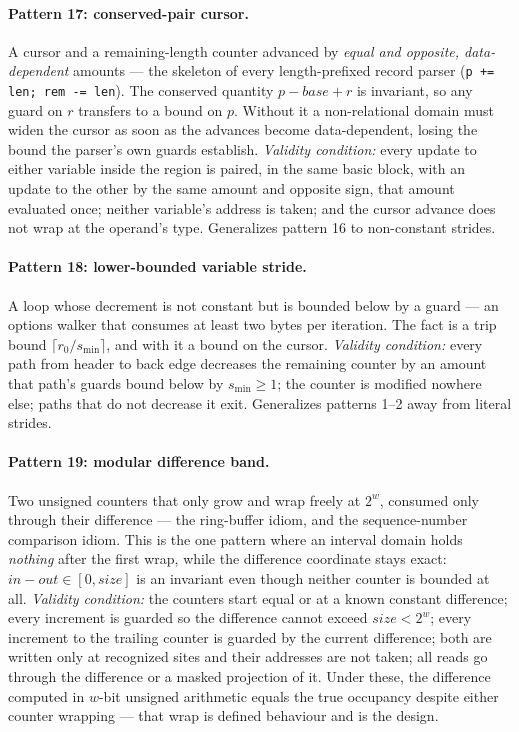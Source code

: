 \documentclass[11pt,a4paper]{article}
\begin{document}
\paragraph{Pattern 17: conserved-pair cursor.} A cursor and a remaining-length counter
advanced by \emph{equal and opposite, data-dependent} amounts --- the skeleton of every
length-prefixed record parser (\texttt{p += len; rem -= len}). The conserved quantity
$p - \mathit{base} + r$ is invariant, so any guard on $r$ transfers to a bound on $p$.
Without it a non-relational domain must widen the cursor as soon as the advances become
data-dependent, losing the bound the parser's own guards establish. \emph{Validity
condition:} every update to either variable inside the region is paired, in the same
basic block, with an update to the other by the same amount and opposite sign, that
amount evaluated once; neither variable's address is taken; and the cursor advance does
not wrap at the operand's type. Generalizes pattern 16 to non-constant strides.

\paragraph{Pattern 18: lower-bounded variable stride.} A loop whose decrement is not
constant but is bounded below by a guard --- an options walker that consumes at least two
bytes per iteration. The fact is a trip bound $\lceil r_0 / s_{\min} \rceil$, and with it
a bound on the cursor. \emph{Validity condition:} every path from header to back edge
decreases the remaining counter by an amount that path's guards bound below by
$s_{\min} \ge 1$; the counter is modified nowhere else; paths that do not decrease it
exit. Generalizes patterns 1--2 away from literal strides.

\paragraph{Pattern 19: modular difference band.} Two unsigned counters that only grow and
wrap freely at $2^w$, consumed only through their difference --- the ring-buffer idiom,
and the sequence-number comparison idiom. This is the one pattern where an interval domain
holds \emph{nothing} after the first wrap, while the difference coordinate stays exact:
$\mathit{in} - \mathit{out} \in [0, \mathit{size}]$ is an invariant even though neither
counter is bounded at all. \emph{Validity condition:} the counters start equal or at a
known constant difference; every increment is guarded so the difference cannot exceed
$\mathit{size} < 2^w$; every increment to the trailing counter is guarded by the current
difference; both are written only at recognized sites and their addresses are not taken;
all reads go through the difference or a masked projection of it. Under these, the
difference computed in $w$-bit unsigned arithmetic equals the true occupancy despite
either counter wrapping --- that wrap is defined behaviour and is the design.
\end{document}
